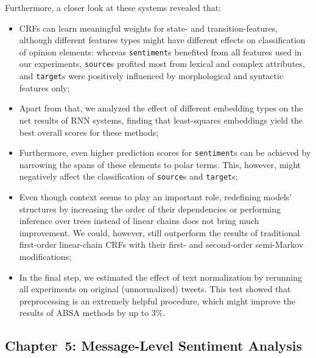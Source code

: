 \documentclass[11pt]{article}
\newcommand{\markable}[1]{\texttt{#1}}
\begin{document}
Furthermore, a closer look at these systems revealed that:
\begin{itemize}
\item CRFs can learn meaningful weights for state- and
  transition-features, although different features types might have
  different effects on classification of opinion elements: whereas
  \markable{sentiment}s benefited from all features used in our
  experiments, \markable{source}s profited most from lexical and
  complex attributes, and \markable{target}s were positively
  influenced by morphological and syntactic features only;
\item Apart from that, we analyzed the effect of different embedding
  types on the net results of RNN systems, finding that least-squares
  embeddings yield the best overall scores for these methods;
\item Furthermore, even higher prediction scores for
  \markable{sentiment}s can be achieved by narrowing the spans of
  these elements to polar terms.  This, however, might negatively
  affect the classification of \markable{source}s and
  \markable{target}s;
\item Even though context seems to play an important role, redefining
  models' structures by increasing the order of their dependencies or
  performing inference over trees instead of linear chains does not
  bring much improvement.  We could, however, still outperform the
  results of traditional first-order linear-chain CRFs with their
  first- and second-order semi-Markov modifications;
\item In the final step, we estimated the effect of text normalization
  by rerunning all experiments on original (unnormalized) tweets.
  This test showed that preprocessing is an extremely helpful
  procedure, which might improve the results of ABSA methods by up to
  3\%.
\end{itemize}

\subsection{Chapter~5: Message-Level Sentiment Analysis}
\end{document}
